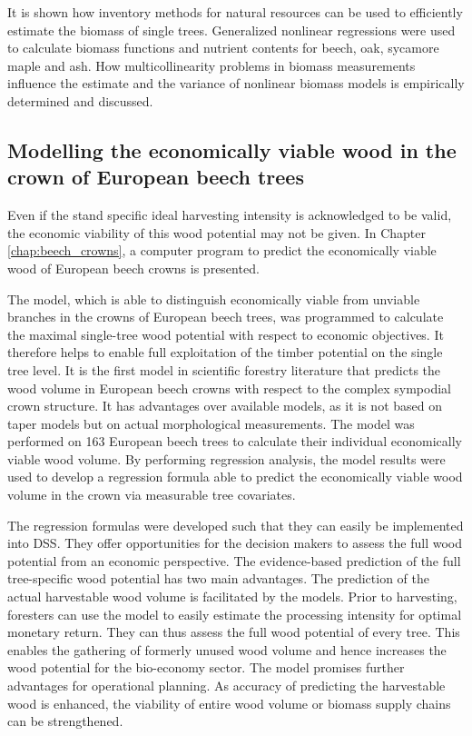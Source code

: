 It is shown how inventory methods for natural resources can be used to efficiently estimate the biomass of single trees. Generalized nonlinear regressions were used to calculate biomass functions and nutrient contents for beech, oak, sycamore maple and ash. How multicollinearity problems in biomass measurements influence the estimate and the variance of nonlinear biomass models is empirically determined and discussed.

\subsection{Modelling the economically viable wood in the crown of European beech trees}
\label{subsec:intro:struct:beech_crowns}
Even if the stand specific ideal harvesting intensity is acknowledged to be valid, the economic viability of this wood potential may not be given. In Chapter \ref{chap:beech_crowns}, a computer program to predict the economically viable wood of European beech crowns is presented.

The model, which is able to distinguish economically viable from unviable branches in the crowns of European beech trees, was programmed to calculate the maximal single-tree wood potential with respect to economic objectives. It therefore helps to enable full exploitation of the timber potential on the single tree level. It is the first model in scientific forestry literature that predicts the wood volume in European beech crowns with respect to the complex sympodial crown structure. It has advantages over available models, as it is not based on taper models but on actual morphological measurements. The model was performed on 163 European beech trees to calculate their individual economically viable wood volume. By performing regression analysis, the model results were used to develop a regression formula able to predict the economically viable wood volume in the crown via measurable tree covariates.

The regression formulas were developed such that they can easily be implemented into DSS. They offer opportunities for the decision makers to assess the full wood potential from an economic perspective. The evidence-based prediction of the full tree-specific wood potential has two main advantages. The prediction of the actual harvestable wood volume is facilitated by the models. Prior to harvesting, foresters can use the model to easily estimate the processing intensity for optimal monetary return. They can thus assess the full wood potential of every tree. This enables the gathering of formerly unused wood volume and hence increases the wood potential for the bio-economy sector. The model promises further advantages for operational planning. As accuracy of predicting the harvestable wood is enhanced, the viability of entire wood volume or biomass supply chains can be strengthened.

